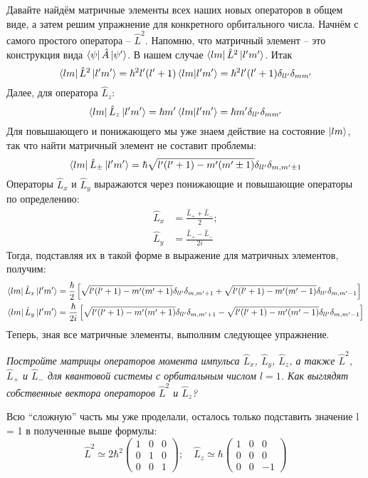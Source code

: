 Давайте найдём матричные элементы всех наших новых операторов в общем виде, а затем решим упражнение для конкретного орбитального числа. Начнём с самого простого оператора -- $\hat{L}^2$. Напомню, что матричный элемент -- это конструкция вида $\bra{\psi}\hat{A}\ket{\psi'}$. В нашем случае $\bra{lm}\hat{L}^2\ket{l'm'}$. Итак
\[
\bra{lm}\hat{L}^2\ket{l'm'} = \hbar^2l'(l'+1)\bra{lm}\ket{l'm'} = \hbar^2l'(l'+1)\delta_{ll'}\delta_{mm'}
\]
Далее, для оператора $\hat{L}_z$:
\[
\bra{lm}\hat{L}_z\ket{l'm'} = \hbar m'\bra{lm}\ket{l'm'} = \hbar m'\delta_{ll'}\delta_{mm'}
\]
Для повышающего и понижающего мы уже знаем действие на состояние $\ket{lm}$, так что найти матричный элемент не составит проблемы:
\[
    \bra{lm}\hat{L}_{\pm}\ket{l'm'} = \hbar\sqrt{l'(l'+1) - m'(m' \pm 1)}\delta_{ll'}\delta_{m,m'\pm 1}
\]
Операторы $\hat{L}_x$ и $\hat{L}_y$ выражаются через понижающие и повышающие операторы по определению:
\begin{align*}
    \hat{L}_x & = \frac{\hat{L}_+ + \hat{L}_-}{2};\\
    \hat{L}_y & = \frac{\hat{L}_+ - \hat{L}_-}{2i}
\end{align*}
Тогда, подставляя их в такой форме в выражение для матричных элементов, получим:
\begin{align*}
\bra{lm}\hat{L}_{x}\ket{l'm'} &= \frac{\hbar}{2}\left[\sqrt{l'(l'+1) - m'(m' + 1)}\delta_{ll'}\delta_{m,m' + 1} + \sqrt{l'(l'+1) - m'(m' - 1)}\delta_{ll'}\delta_{m,m' - 1}\right]\\
\bra{lm}\hat{L}_{y}\ket{l'm'} &= \frac{\hbar}{2i}\left[\sqrt{l'(l'+1) - m'(m' + 1)}\delta_{ll'}\delta_{m,m' + 1} - \sqrt{l'(l'+1) - m'(m' - 1)}\delta_{ll'}\delta_{m,m' - 1}\right]
\end{align*}
Теперь, зная все матричные элементы, выполним следующее упражнение.
\begin{center}
    \textit{Постройте матрицы операторов момента импульса $\hat{L}_x$, $\hat{L}_y$, $\hat{L}_z$, а также $\hat{L}^2$, $\hat{L}_+$ и $\hat{L}_-$ для квантовой системы с орбитальным числом $l = 1$. Как выглядят собственные вектора операторов $\hat{L}^2$ и $\hat{L}_z$?}
\end{center}

Всю ``сложную'' часть мы уже проделали, осталось только подставить значение l = 1 в полученные выше формулы:
\[
\hat{L}^2 \simeq  2\hbar^2 \left(\begin{array}{ccc} 1 & 0 & 0 \\ 0 & 1 & 0 \\ 0 & 0 & 1 \end{array} \right); \quad \hat{L}_z \simeq  \hbar \left(\begin{array}{ccc} 1 & 0 & 0 \\ 0 & 0 & 0 \\ 0 & 0 & -1 \end{array} \right)
\]

